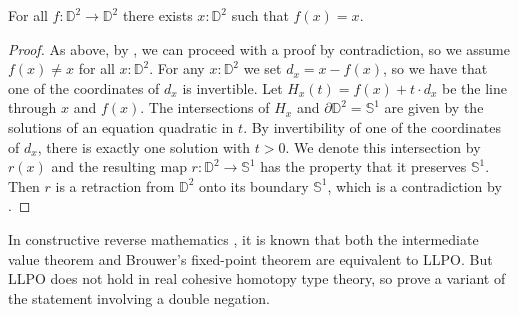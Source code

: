 \begin{theorem}
  For all $f:\mathbb{D}^2\to \mathbb{D}^2$ there exists $x:\mathbb{D}^2$ such that $f(x)=x$.
\end{theorem}

\begin{proof}
  As above, by , we can proceed with a proof by contradiction,
  so we assume $f(x)\neq x$ for all $x:\mathbb{D}^2$.
  For any $x:\mathbb{D}^2$ we set $d_x= x-f(x)$, so we have that one of the coordinates of $d_x$ is invertible.
  Let $H_x(t) = f(x) + t\cdot d_x $ be the line through $x$ and $f(x)$.
  The intersections of $H_x$ and $\partial\mathbb{D}^2=\mathbb{S}^1$ are given by the solutions of an equation quadratic in $t$. By invertibility of one of the coordinates of $d_x$, there is exactly one solution with $t> 0$.
  We denote this intersection by $r(x)$ and the resulting map $r:\mathbb D^2\to\mathbb S^1$ has the property that it preserves $\mathbb{S}^1$.
  Then $r$ is a retraction from $\mathbb{D}^2$ onto its boundary $\mathbb{S}^1$, which is a contradiction by .
\end{proof}

\begin{remark}
In constructive reverse mathematics \cite{HannesDiener}, it is known that both the intermediate value theorem and Brouwer's fixed-point theorem are equivalent to LLPO. But LLPO does not hold in real cohesive homotopy type theory, so \cite{shulman-Brouwer-fixed-point} prove a variant of the statement involving a double negation.
\end{remark}

